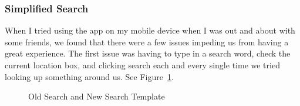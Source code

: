 \documentclass[11pt]{article}
\begin{document}
\subsubsection{Simplified Search}
When I tried using the app on my mobile device when I was out and about with some friends, we found that there were a few issues impeding us from having a great experience. The first issue was having to type in a search word, check the current location box, and clicking search each and every single time we tried looking up something around us. See Figure~\ref{fig:SearchSimple}.

\begin{figure}[H]
    \centering
    \qquad
    \caption{Old Search and New Search Template}
    \label{fig:SearchSimple}          

\end{figure}
\end{document}
